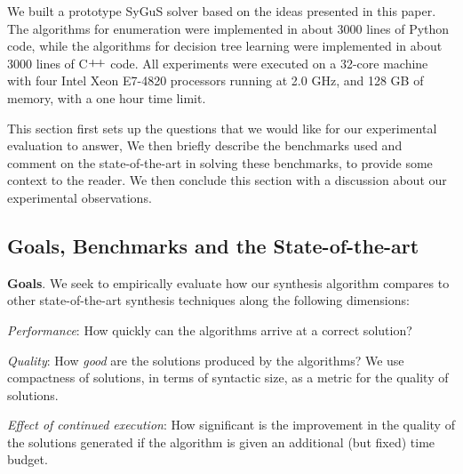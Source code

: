 \documentclass{llncs}
\newcommand{\sygus}{{\sffamily\fontsize{8.5}{10}\selectfont
    SyGuS}\xspace}
\renewcommand{\paragraph}[1]{\par\noindent\textbf{#1}.}
\begin{document}
We built a prototype \sygus solver based on the ideas presented in
this paper. The algorithms for enumeration were implemented in
about 3000 lines of Python code, while the algorithms for decision
tree learning were implemented in about 3000 lines of
C$\raisebox{1pt}{+\!+}$ code. All experiments were executed on a
32-core machine with four Intel Xeon E7-4820 processors running at 2.0
GHz, and 128 GB of memory, with a one hour time limit.

This section first sets up the questions that we would like for our
experimental evaluation to answer, We then briefly describe
the benchmarks used and comment on the state-of-the-art in solving
these benchmarks, to provide some context to the reader.
We then conclude this section with a discussion about our
experimental observations.

\subsection{Goals, Benchmarks and the State-of-the-art}
\paragraph{Goals}
We seek to empirically evaluate how our synthesis algorithm compares
to other state-of-the-art synthesis techniques along the following
dimensions:
\begin{inparaenum}[(a)]
\item
\emph{Performance}: How quickly can the algorithms arrive at a correct
solution?
\item
\emph{Quality}: How \emph{good} are the solutions produced by the
algorithms? We use compactness of solutions, in terms of syntactic
size, as a metric for the quality of solutions.
\item
\emph{Effect of continued execution}: How significant is the
improvement in the quality of the solutions generated if the
algorithm is given an additional (but fixed) time budget.
\end{inparaenum}
\end{document}

